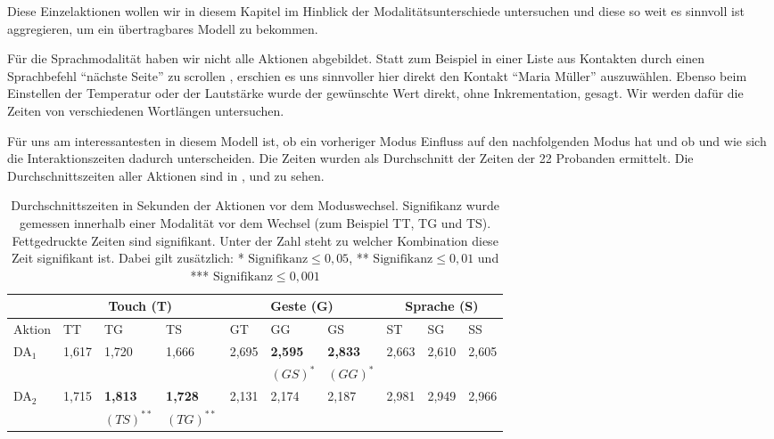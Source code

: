 Diese Einzelaktionen wollen wir in diesem Kapitel im Hinblick der Modalitätsunterschiede untersuchen und diese so weit es sinnvoll ist aggregieren, um ein übertragbares Modell zu bekommen.

Für die Sprachmodalität haben wir nicht alle Aktionen abgebildet. Statt zum Beispiel in einer Liste aus Kontakten durch einen Sprachbefehl "`nächste Seite"' zu scrollen , erschien es uns sinnvoller hier direkt den Kontakt "`Maria Müller"' auszuwählen. Ebenso beim Einstellen der Temperatur oder der Lautstärke wurde der gewünschte Wert direkt, ohne Inkrementation, gesagt. Wir werden dafür die Zeiten von verschiedenen Wortlängen untersuchen. 

Für uns am interessantesten in diesem Modell ist, ob ein vorheriger Modus Einfluss auf den nachfolgenden Modus hat und ob und wie sich die Interaktionszeiten dadurch unterscheiden. Die Zeiten wurden als Durchschnitt der Zeiten der 22 Probanden ermittelt. Die Durchschnittszeiten aller Aktionen sind in ,  und  zu sehen. 
\begin{table}[ht]
  \centering
	\begin{tabular}{|l|l|l|l|l|l|l|l|l|l|}
		\hline
		& \multicolumn{3}{|c|}{Touch (T)} & \multicolumn{3}{|c|}{Geste (G)}&\multicolumn{3}{|c|}{Sprache (S)}\\
		\hline
		Aktion 					& TT 		& TG 		& TS 		& GT 		& GG 		& GS 		& ST 		& SG 		& SS\\
		\hline
		DA$_1$ 	& 1,617 & 1,720	& 1,666 &	2,695	&	\textbf{2,595}	&	\textbf{2,833}	&	2,663	& 2,610	& 2,605\\
					&  			&  			&				&				&		\small{$(GS)^*$}					&	\small{$(GG)^*$}			 			&		&	& \\
		\hline
		DA$_2$ 	& 1,715 & \textbf{1,813}	& \textbf{1,728}	&	2,131	&	2,174	&	2,187	&	2,981	&	2,949	& 2,966\\
					&  			& \small{$(TS)^{**}$}				&	\small{$(TG)^{**}$}			&				&				&				&		&	& \\
		\hline			
  \end{tabular}
	\caption[Durchschnittszeiten der Aktionen vor dem Moduswechsel]{Durchschnittszeiten in Sekunden der Aktionen vor dem Moduswechsel. Signifikanz wurde gemessen innerhalb einer Modalität vor dem Wechsel (zum Beispiel TT, TG und TS). Fettgedruckte Zeiten sind signifikant. Unter der Zahl steht zu welcher Kombination diese Zeit signifikant ist. Dabei gilt zusätzlich: * $\text{Signifikanz} \leq 0,05$, ** $\text{Signifikanz} \leq 0,01$ und *** $\text{Signifikanz} \leq 0,001$}
\label{tab:OperatorzeitenVorWechsel1}
\end{table}

